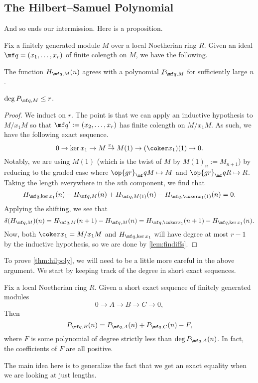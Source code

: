\documentclass[../notes.tex]{subfiles}
\begin{document}
\subsection{The Hilbert--Samuel Polynomial}
And so ends our intermission. Here is a proposition.
\begin{proposition} \label{prop:onesideofhilsampoly}
	Fix a finitely generated module $M$ over a local Noetherian ring $R$. Given an ideal $\mf q=(x_1,\ldots,x_r)$ of finite colength on $M$, we have the following.
	\begin{listalph}
		\item The function $H_{\mf q,M}(n)$ agrees with a polynomial $P_{\mf q,M}$ for sufficiently large $n$.
		\item $\deg P_{\mf q,M}\le r$.
	\end{listalph}
\end{proposition}
\begin{proof}
	We induct on $r$. The point is that we can apply an inductive hypothesis to $M/x_1M$ so that $\mf q':=(x_2,\ldots,x_r)$ has finite colength on $M/x_1M$. As such, we have the following exact sequence.
	\[0\to\ker x_1\to M\stackrel{x_1}\to M(1)\to(\coker x_1)(1)\to0.\]
	Notably, we are using $M(1)$ (which is the twist of $M$ by $M(1)_n:=M_{n+1}$) by reducing to the graded case where $\op{gr}_\mf qM\mapsto M$ and $\op{gr}_\mf qR\mapsto R$. Taking the length everywhere in the $n$th component, we find that
	\[H_{\mf q,\ker x_1}(n)-H_{\mf q,M}(n)+H_{\mf q,M(1)}(n)-H_{\mf q,\coker x_1(1)}(n)=0.\]
	Applying the shifting, we see that
	\[\delta(H_{\mf q,M})(n)=H_{\mf q,M}(n+1)-H_{\mf q,M}(n)=H_{\mf q,\coker x_1}(n+1)-H_{\mf q,\ker x_1}(n).\]
	Now, both $\coker x_1=M/x_1M$ and $H_{\mf q,\ker x_1}$ will have degree at most $r-1$ by the inductive hypothesis, so we are done by \autoref{lem:findiffs}.
\end{proof}
To prove \autoref{thm:hilpoly}, we will need to be a little more careful in the above argument. We start by keeping track of the degree in short exact sequences.
\begin{lemma} \label{lem:hilpolyadditive}
	Fix a local Noetherian ring $R$. Given a short exact sequence of finitely generated modules
	\[0\to A\to B\to C\to 0,\]
	Then
	\[P_{\mf q,B}(n)=P_{\mf q,A}(n)+P_{\mf q,C}(n)-F,\]
	where $F$ is some polynomial of degree strictly less than $\deg P_{\mf q,A}(n)$. In fact, the coefficients of $F$ are all positive.
\end{lemma}
\begin{remark}
	The main idea here is to generalize the fact that we get an exact equality when we are looking at just lengths.
\end{remark}
\end{document}
